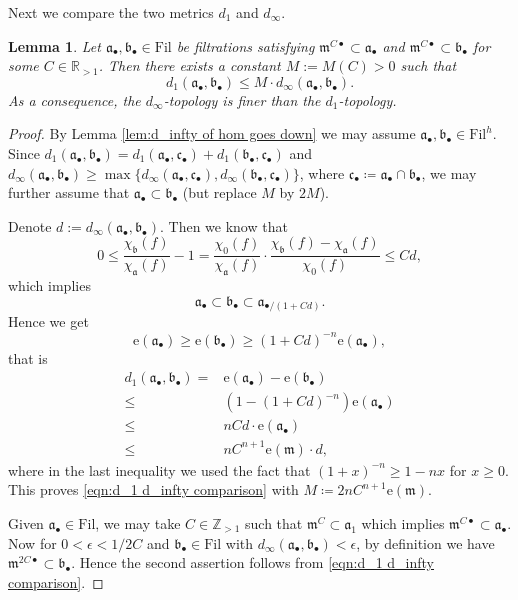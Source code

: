 \documentclass[11pt, leqno]{amsart}%
\theoremstyle{plain}
\newtheorem{lemma}[theorem]{Lemma}
\theoremstyle{definition}
\theoremstyle{remark}
\newcommand{\bR}{\mathbb{R}}
\newcommand{\bZ}{\mathbb{Z}}
\newcommand{\fa}{\mathfrak{a}}
\newcommand{\fb}{\mathfrak{b}}
\newcommand{\fc}{\mathfrak{c}}
\newcommand{\fm}{\mathfrak{m}}
\newcommand{\e}{\mathrm{e}}
\newcommand{\Fil}{\mathrm{Fil}}
\numberwithin{equation}{section}
\begin{document}
Next we compare the two metrics $d_1$ and $d_\infty$.

\begin{lemma}\label{lem:d_infty finer than d_1}
    Let $\fa_\bullet,\fb_\bullet\in\Fil$ be filtrations satisfying $\fm^{C\bullet}\subset\fa_\bullet$ and $\fm^{C\bullet}\subset\fb_\bullet$ for some $C\in\bR_{>1}$. Then there exists a constant $M:=M(C)>0$ such that 
    \begin{equation}\label{eqn:d_1 d_infty comparison}
        d_1(\fa_\bullet,\fb_\bullet)\le M\cdot d_\infty(\fa_\bullet,\fb_\bullet).
    \end{equation}
    As a consequence, the $d_\infty$-topology is finer than the $d_1$-topology. 
\end{lemma}

\begin{proof}
    By Lemma \ref{lem:d_infty of hom goes down} we may assume $\fa_\bullet,\fb_\bullet\in\Fil^h$. Since $d_1(\fa_\bullet,\fb_\bullet)=d_1(\fa_\bullet,\fc_\bullet)+d_1(\fb_\bullet,\fc_\bullet)$ and $d_\infty(\fa_\bullet,\fb_\bullet)\ge\max\{d_\infty(\fa_\bullet,\fc_\bullet),d_\infty(\fb_\bullet,\fc_\bullet)\}$, where $\fc_\bullet\coloneqq\fa_\bullet\cap\fb_\bullet$, we may further assume that $\fa_\bullet\subset\fb_\bullet$ (but replace $M$ by $2M$).
	
    Denote $d:=d_\infty(\fa_\bullet,\fb_\bullet)$. Then we know that 
    \[
        0\le\frac{\chi_\fb(f)}{\chi_\fa(f)}-1=\frac{\chi_0(f)}{\chi_\fa(f)}\cdot\frac{\chi_\fb(f)-\chi_\fa(f)}{\chi_0(f)}\le Cd,
    \]
    which implies
    \[
        \fa_\bullet\subset\fb_\bullet\subset \fa_{\bullet/(1+Cd)}.
    \]
    Hence we get 
    \[
        \e(\fa_\bullet)\ge\e(\fb_\bullet)\ge (1+Cd)^{-n}\e(\fa_\bullet),
    \]
    that is
    \begin{align*}
        d_1(\fa_\bullet,\fb_\bullet)=&\e(\fa_\bullet)-\e(\fb_\bullet)\\
        \le&\left(1-(1+Cd)^{-n}\right)\e(\fa_\bullet)\\
        \le&nCd\cdot \e(\fa_\bullet)\\
        \le&nC^{n+1}\e(\fm)\cdot d,
    \end{align*}
    where in the last inequality we used the fact that $(1+x)^{-n}\ge 1-nx$ for $x\ge 0$. This proves \eqref{eqn:d_1 d_infty comparison} with $M\coloneqq 2nC^{n+1}\e(\fm)$.
	
    Given $\fa_\bullet\in\Fil$, we may take $C\in\bZ_{>1}$ such that $\fm^C\subset \fa_1$ which implies $\fm^{C\bullet}\subset\fa_\bullet$. Now for $0<\epsilon<1/2C$ and $\fb_\bullet\in\Fil$ with $d_\infty(\fa_\bullet,\fb_\bullet)<\epsilon$, by definition we have $\fm^{2C\bullet}\subset\fb_\bullet$. Hence the second assertion follows from \eqref{eqn:d_1 d_infty comparison}.
\end{proof}
\end{document}
